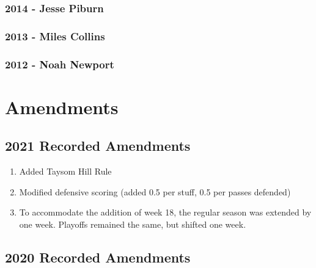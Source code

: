 \documentclass[
]{book}
\providecommand{\tightlist}{%
  \setlength{\itemsep}{0pt}\setlength{\parskip}{0pt}}
\begin{document}
\hypertarget{jesse-piburn-2}{%
\subsection*{\texorpdfstring{\textbf{2014} - Jesse Piburn}{2014 - Jesse Piburn}}\label{jesse-piburn-2}}

\hypertarget{miles-collins-2}{%
\subsection*{\texorpdfstring{\textbf{2013} - Miles Collins}{2013 - Miles Collins}}\label{miles-collins-2}}

\hypertarget{noah-newport-1}{%
\subsection*{\texorpdfstring{\textbf{2012} - Noah Newport}{2012 - Noah Newport}}\label{noah-newport-1}}

\hypertarget{amendments}{%
\chapter{Amendments}\label{amendments}}

\hypertarget{recorded-amendments}{%
\section{2021 Recorded Amendments}\label{recorded-amendments}}

\begin{enumerate}
\def\labelenumi{\arabic{enumi}.}
\tightlist
\item
  Added Taysom Hill Rule
\item
  Modified defensive scoring (added 0.5 per stuff, 0.5 per passes defended)
\item
  To accommodate the addition of week 18, the regular season was extended by one week. Playoffs remained the same, but shifted one week.
\end{enumerate}

\hypertarget{recorded-amendments-1}{%
\section{2020 Recorded Amendments}\label{recorded-amendments-1}}
\end{document}
